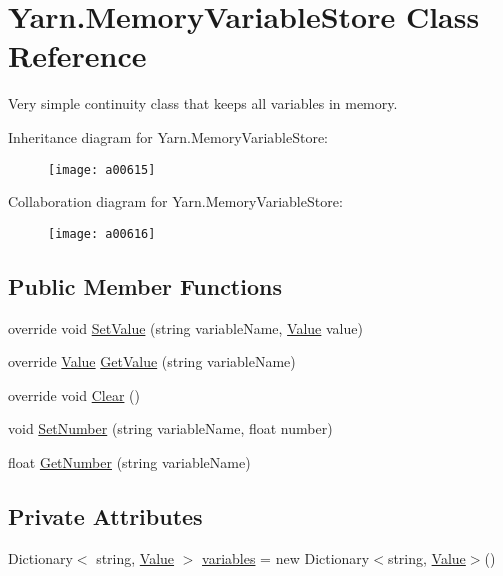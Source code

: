 \hypertarget{a00136}{\section{Yarn.\-Memory\-Variable\-Store Class Reference}
\label{a00136}
}


Very simple continuity class that keeps all variables in memory.  




Inheritance diagram for Yarn.\-Memory\-Variable\-Store\-:
\nopagebreak
\begin{figure}[H]
\begin{center}
\leavevmode
\texttt{[image: a00615]}
\end{center}
\end{figure}


Collaboration diagram for Yarn.\-Memory\-Variable\-Store\-:
\nopagebreak
\begin{figure}[H]
\begin{center}
\leavevmode
\texttt{[image: a00616]}
\end{center}
\end{figure}
\subsection*{Public Member Functions}
\begin{DoxyCompactItemize}
\item 
override void \hyperlink{a00136_a653a459811e5c19549f4b31269093ef5}{Set\-Value} (string variable\-Name, \hyperlink{a00187}{Value} value)
\item 
override \hyperlink{a00187}{Value} \hyperlink{a00136_a0ce77e8245c504a777540e359704aa2a}{Get\-Value} (string variable\-Name)
\item 
override void \hyperlink{a00136_aa6d243e7ef02b91f793a221f509dae69}{Clear} ()
\item 
void \hyperlink{a00042_a48b93de9cd7ae61d0cd9583c8330d3ee}{Set\-Number} (string variable\-Name, float number)
\item 
float \hyperlink{a00042_a1b7f7f4468b2463e7b47986d99362279}{Get\-Number} (string variable\-Name)
\end{DoxyCompactItemize}
\subsection*{Private Attributes}
\begin{DoxyCompactItemize}
\item 
Dictionary$<$ string, \hyperlink{a00187}{Value} $>$ \hyperlink{a00136_aad18acd95297edb8ed496857337f8071}{variables} = new Dictionary$<$string, \hyperlink{a00187}{Value}$>$()
\end{DoxyCompactItemize}


